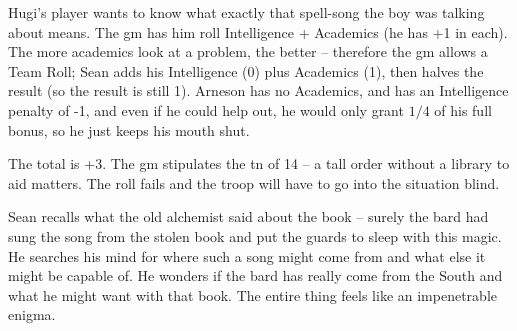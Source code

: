 \begin{exampletext}

  Hugi's player wants to know what exactly that spell-song the boy was talking about means.
  The \gls{gm} has him roll Intelligence + Academics (he has +1 in each).
  The more academics look at a problem, the better -- therefore the \gls{gm} allows a Team Roll; Sean adds his Intelligence (0) plus Academics (1), then halves the result (so the result is still 1).
  Arneson has no Academics, and has an Intelligence penalty of -1, and even if he could help out, he would only grant $1/4$ of his full bonus, so he just keeps his mouth shut.

  The total is +3.
  The \gls{gm} stipulates the \gls{tn} of 14 -- a tall order without a library to aid matters.
  The roll fails and the troop will have to go into the situation blind.

  Sean recalls what the old alchemist said about the book -- surely the bard had sung the song from the stolen book and put the guards to sleep with this magic.
  He searches his mind for where such a song might come from and what else it might be capable of.
  He wonders if the bard has really come from the South and what he might want with that book.
  The entire thing feels like an impenetrable enigma.

\end{exampletext}
